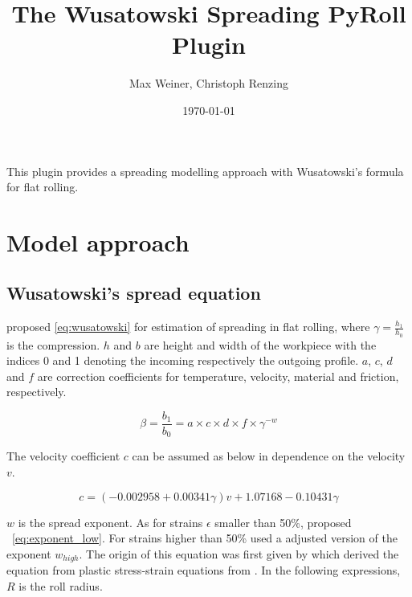 \documentclass[11pt]{PyRollDocs}
\begin{document}
    \title{The Wusatowski Spreading PyRoll Plugin}
    \author{Max Weiner, Christoph Renzing}
    \date{\today}

    \maketitle

    This plugin provides a spreading modelling approach with Wusatowski's formula for flat rolling.


    \section{Model approach}\label{sec:model-approach}

    \subsection{Wusatowski's spread equation}\label{subsec:wusatowski's-spread-equation}

    \textcite{Wusatowski1969} proposed \autoref{eq:wusatowski} for estimation of spreading in flat rolling,
    where $\gamma = \frac{h_1}{h_0}$ is the compression. $h$ and $b$ are height and width of the workpiece with the indices
    0 and 1 denoting the incoming respectively the outgoing profile. $a$, $c$, $d$ and $f$ are correction
    coefficients for temperature, velocity, material and friction, respectively.

    \begin{equation}
        \beta = \frac{b_1}{b_0} = a \times c \times d \times f \times \gamma^{-w}
        \label{eq:wusatowski}
    \end{equation}

    \noindent The velocity coefficient $c$ can be assumed as below in dependence on the velocity $v$.

    \begin{equation}
        c = \left(-0.002958 + 0.00341 \gamma \right) v + 1.07168 - 0.10431 \gamma
        \label{eq:velocity-coefficient}
    \end{equation}

    $w$ is the spread exponent.
    As for strains $\epsilon$ smaller than 50\%, \textcite{Wusatowski1969} proposed ~\autoref{eq:exponent_low}.
    For strains higher than 50\% \textcite{Wusatowski1969} used a adjusted version of the exponent $w_{high}$.
    The origin of this equation was first given by \textcite{Hill1955} which derived the equation from plastic stress-strain equations from \textcite{Mises1913}.
    In the following expressions, $R$ is the roll radius.
\end{document}
